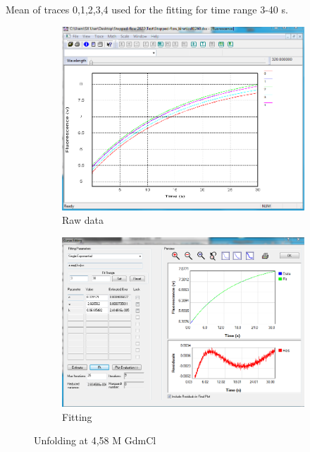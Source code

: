 \documentclass[a4paper,english,12pt,bibliography=totoc]{scrreprt}
\begin{document}
Mean of traces 0,1,2,3,4 used for the fitting for time range 3-40 s.
\begin{figure}[H]
    \centering
    \begin{subfigure}[b]{0.45\textwidth}
        \centering
        \includegraphics[width=\textwidth]{Images/G8/uf6_raw.PNG}
        \caption{Raw data }
        \label{fig:sub1}
    \end{subfigure}
    \hspace{0cm} %
    \begin{subfigure}[b]{0.45\textwidth}
        \centering
        \includegraphics[width=\textwidth]{Images/G8/uf6_fitting.PNG}
        \caption{Fitting}
        \label{fig:sub2}
    \end{subfigure}
    \caption{Unfolding at 4,58 M GdmCl }
    \label{fig:main}
\end{figure}
\end{document}
